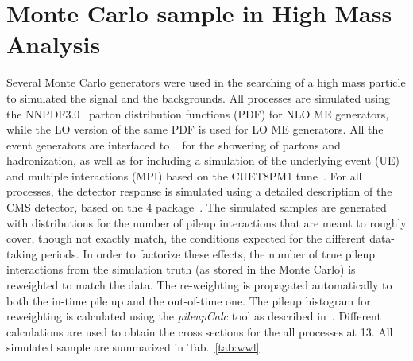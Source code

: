 \section{Monte Carlo sample in High Mass Analysis}
\label{MSsample}
Several  Monte Carlo  generators were used in the searching of a high mass particle to simulated the signal and the backgrounds. 
All processes are simulated using the NNPDF3.0~\cite{Ball:2013hta,Ball:2011uy} parton distribution functions (PDF) for NLO ME generators,
while the LO version of the same PDF is used for LO ME generators. All the event generators are interfaced 
to ~\cite{Sjostrand:2007gs} for the showering of
partons and hadronization, as well as for including a simulation of the underlying event (UE) and multiple interactions (MPI)
based on the CUET8PM1 tune~\cite{Khachatryan:2015pea}. 
For all processes, the detector response is simulated using a detailed
description of the CMS detector, based on the \GEANT{}4 package~\cite{Agostinelli:2002hh}. 
The simulated samples are generated with distributions for the number of pileup interactions that are meant to roughly cover,
though not exactly match, the conditions expected for the different data-taking periods. In order to factorize these effects, 
the number of true pileup interactions from the simulation truth (as stored in the Monte Carlo)
is reweighted to match the data.
The re-weighting is propagated automatically to both the in-time pile up and the out-of-time one.
The pileup histogram for reweighting is calculated using the \emph{pileupCalc} tool as described in~\cite{puJSON}. 
Different calculations are used to obtain the cross sections for the all processes at 13\TeV. 
All simulated sample are summarized in Tab.~\ref{tab:wwl}.



